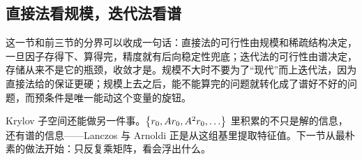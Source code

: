 \subsection{直接法看规模，迭代法看谱}

这一节和前三节的分界可以收成一句话：直接法的可行性由规模和稀疏结构决定，一旦因子存得下、算得完，精度就有后向稳定性兜底；迭代法的可行性由谱决定，存储从来不是它的瓶颈，收敛才是。规模不大时不要为了``现代''而上迭代法，因为直接法给的保证更硬；规模上去之后，能不能算完的问题就转化成了谱好不好的问题，而预条件是唯一能动这个变量的旋钮。

Krylov 子空间还能做另一件事。\(\left\{r_0,Ar_0,A^2r_0,\ldots\right\}\) 里积累的不只是解的信息，还有谱的信息——Lanczos 与 Arnoldi 正是从这组基里提取特征值。下一节从最朴素的做法开始：只反复乘矩阵，看会浮出什么。
